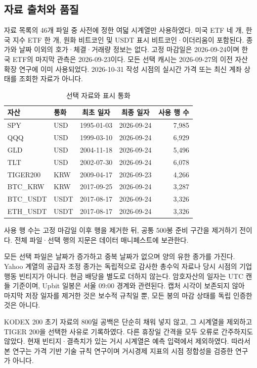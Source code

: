 \documentclass[11pt,a4paper]{article}
\begin{document}
\subsection{자료 출처와 품질}
자료 목록의 46개 파일 중 사전에 정한 여덟 시계열만 사용하였다. 미국 ETF 네 개, 한국 지수 ETF 한 개, 원화 비트코인 및 USDT 표시 비트코인·이더리움이 포함된다. 종가와 날짜 이외의 호가·체결·거래량 정보는 없다. 고정 마감일은 2026-09-24이며 한국 ETF의 마지막 관측은 2026-09-23이다. 모든 선택 캐시는 2026-09-27의 이전 자산 확장 연구에 이미 사용되었다. 2026-10-31 작성 시점의 실시간 가격 또는 최신 계좌 상태를 조회한 자료가 아니다.
\begin{table}[htbp]\centering
\small
\setlength{\tabcolsep}{4pt}
\caption{선택 자료와 표시 통화}
\begin{tabular}{llccr}
\toprule
자산 & 통화 & 최초 일자 & 최종 일자 & 사용 행 수 \\
\midrule
SPY & USD & 1995-01-03 & 2026-09-24 & 7,985 \\
QQQ & USD & 1999-03-10 & 2026-09-24 & 6,929 \\
GLD & USD & 2004-11-18 & 2026-09-24 & 5,496 \\
TLT & USD & 2002-07-30 & 2026-09-24 & 6,078 \\
TIGER200 & KRW & 2009-04-17 & 2026-09-23 & 4,266 \\
BTC\_KRW & KRW & 2017-09-25 & 2026-09-24 & 3,287 \\
BTC\_USDT & USDT & 2017-08-17 & 2026-09-24 & 3,326 \\
ETH\_USDT & USDT & 2017-08-17 & 2026-09-24 & 3,326 \\
\bottomrule
\end{tabular}
\par\smallskip\begin{minipage}{\linewidth}\footnotesize 사용 행 수는 고정 마감일 이후 행을 제거한 뒤, 공통 500봉 준비 구간을 제거하기 전이다. 전체 파일·선택 행의 지문은 데이터 매니페스트에 보관한다.\end{minipage}
\end{table}

모든 선택 파일은 날짜가 증가하고 중복 날짜가 없으며 양의 유한 종가를 가진다. Yahoo 계열의 공급자 조정 종가는 독립적으로 감사한 총수익 자료나 당시 시점의 기업행동 빈티지가 아니다. 현금 배당을 별도로 더하지 않는다. 암호자산의 일자는 UTC 캔들 기준이며, Upbit 일봉은 서울 09:00 경계와 관련된다. 캡처 시각이 보존되지 않아 마지막 저장 일자를 제거한 것은 보수적 규칙일 뿐, 모든 봉의 마감 상태를 독립 인증한 것은 아니다.

KODEX 200 초기 자료의 800일 공백은 단순히 채워 넣지 않고, 그 시계열을 제외하고 TIGER 200을 선택한 사유로 기록하였다. 다른 휴장일 간격을 모두 오류로 간주하지도 않았다. 현재 빈티지·결측치가 있는 거시 시계열은 예측 입력에서 제외하였다. 따라서 본 연구는 가격 기반 기술 규칙 연구이며 거시경제 지표의 시점 정합성을 검증한 연구가 아니다.
\end{document}
